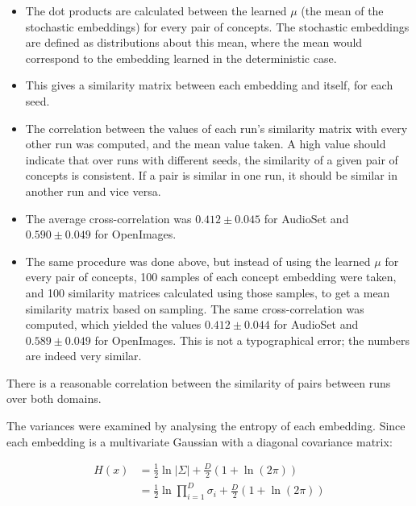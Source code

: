 \begin{itemize}
    \item The dot products are calculated between the learned $\mu$ (the mean of the stochastic embeddings) for every pair of concepts. The stochastic embeddings are defined as distributions about this mean, where the mean would correspond to the embedding learned in the deterministic case. 
    \item This gives a similarity matrix between each embedding and itself, for each seed. \label{def:selfsimilarity}
    \item The correlation between the values of each run's similarity matrix with every other run was computed, and the mean value taken. A high value should indicate that over runs with different seeds, the similarity of a given pair of concepts is consistent. If a pair is similar in one run, it should be similar in another run and vice versa. 
    \item The average cross-correlation was $ 0.412 \pm 0.045$ for AudioSet and $0.590 \pm 0.049$ for OpenImages. 
    \item The same procedure was done above, but instead of using the learned $\mu$ for every pair of concepts, 100 samples of each concept embedding were taken, and 100 similarity matrices calculated using those samples, to get a mean similarity matrix based on sampling. The same cross-correlation was computed, which yielded the values $ 0.412 \pm 0.044$ for AudioSet and $0.589 \pm 0.049$ for OpenImages. This is not a typographical error; the numbers are indeed very similar. 
\end{itemize}

There is a reasonable correlation between the similarity of pairs between runs over both domains. 

The variances were examined by analysing the entropy of each embedding. Since each embedding is a multivariate Gaussian with a diagonal covariance matrix:

\begin{equation*}
\begin{split}
H(x) &= \frac{1}{2} \ln |\Sigma| + \frac{D}{2}(1 + \ln(2 \pi))\\
&= \frac{1}{2} \ln \prod_{i=1}^D \sigma_i + \frac{D}{2}(1 + \ln(2 \pi))\\
\end{split}
\end{equation*}

